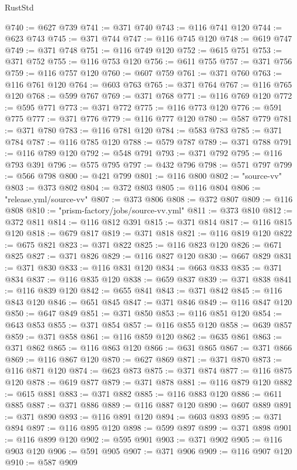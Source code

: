 \begin{lexlean}{RustStd}
\begin{coremodule}
@740 := @627 @739
@741 := @371 @740
@743 := @116 @741 @120
@744 := @623 @743
@745 := @371 @744
@747 := @116 @745 @120
@748 := @619 @747
@749 := @371 @748
@751 := @116 @749 @120
@752 := @615 @751
@753 := @371 @752
@755 := @116 @753 @120
@756 := @611 @755
@757 := @371 @756
@759 := @116 @757 @120
@760 := @607 @759
@761 := @371 @760
@763 := @116 @761 @120
@764 := @603 @763
@765 := @371 @764
@767 := @116 @765 @120
@768 := @599 @767
@769 := @371 @768
@771 := @116 @769 @120
@772 := @595 @771
@773 := @371 @772
@775 := @116 @773 @120
@776 := @591 @775
@777 := @371 @776
@779 := @116 @777 @120
@780 := @587 @779
@781 := @371 @780
@783 := @116 @781 @120
@784 := @583 @783
@785 := @371 @784
@787 := @116 @785 @120
@788 := @579 @787
@789 := @371 @788
@791 := @116 @789 @120
@792 := @548 @791
@793 := @371 @792
@795 := @116 @793 @391
@796 := @575 @795
@797 := @432 @796
@798 := @571 @797
@799 := @566 @798
@800 := @421 @799
@801 := @116 @800
@802 := "source-vv"
@803 := @373 @802
@804 := @372 @803
@805 := @116 @804
@806 := "release.yml/source-vv"
@807 := @373 @806
@808 := @372 @807
@809 := @116 @808
@810 := "prism-factory/jobs/source-vv.yml"
@811 := @373 @810
@812 := @372 @811
@814 := @116 @812 @391
@815 := @371 @814
@817 := @116 @815 @120
@818 := @679 @817
@819 := @371 @818
@821 := @116 @819 @120
@822 := @675 @821
@823 := @371 @822
@825 := @116 @823 @120
@826 := @671 @825
@827 := @371 @826
@829 := @116 @827 @120
@830 := @667 @829
@831 := @371 @830
@833 := @116 @831 @120
@834 := @663 @833
@835 := @371 @834
@837 := @116 @835 @120
@838 := @659 @837
@839 := @371 @838
@841 := @116 @839 @120
@842 := @655 @841
@843 := @371 @842
@845 := @116 @843 @120
@846 := @651 @845
@847 := @371 @846
@849 := @116 @847 @120
@850 := @647 @849
@851 := @371 @850
@853 := @116 @851 @120
@854 := @643 @853
@855 := @371 @854
@857 := @116 @855 @120
@858 := @639 @857
@859 := @371 @858
@861 := @116 @859 @120
@862 := @635 @861
@863 := @371 @862
@865 := @116 @863 @120
@866 := @631 @865
@867 := @371 @866
@869 := @116 @867 @120
@870 := @627 @869
@871 := @371 @870
@873 := @116 @871 @120
@874 := @623 @873
@875 := @371 @874
@877 := @116 @875 @120
@878 := @619 @877
@879 := @371 @878
@881 := @116 @879 @120
@882 := @615 @881
@883 := @371 @882
@885 := @116 @883 @120
@886 := @611 @885
@887 := @371 @886
@889 := @116 @887 @120
@890 := @607 @889
@891 := @371 @890
@893 := @116 @891 @120
@894 := @603 @893
@895 := @371 @894
@897 := @116 @895 @120
@898 := @599 @897
@899 := @371 @898
@901 := @116 @899 @120
@902 := @595 @901
@903 := @371 @902
@905 := @116 @903 @120
@906 := @591 @905
@907 := @371 @906
@909 := @116 @907 @120
@910 := @587 @909

\end{coremodule}
\end{lexlean}
